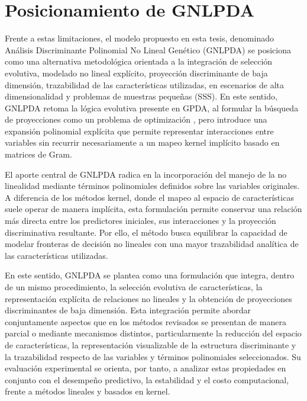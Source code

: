 \section{Posicionamiento de GNLPDA}

Frente a estas limitaciones, el modelo propuesto en esta tesis, denominado Análisis Discriminante Polinomial No Lineal Genético (GNLPDA) se posiciona como una alternativa metodológica orientada a la integración de selección evolutiva, modelado no lineal explícito, proyección discriminante de baja dimensión, trazabilidad de las características utilizadas, en escenarios de alta dimensionalidad y problemas de muestras pequeñas (SSS). En este sentido, GNLPDA retoma la lógica evolutiva presente en GPDA, al formular la búsqueda de proyecciones como un problema de optimización \cite{medina2025genetic}, pero introduce una expansión polinomial explícita que permite representar interacciones entre variables sin recurrir necesariamente a un mapeo kernel implícito basado en matrices de Gram.

El aporte central de GNLPDA radica en la incorporación del manejo de la no linealidad mediante términos polinomiales definidos sobre las variables originales. A diferencia de los métodos kernel, donde el mapeo al espacio de características suele operar de manera implícita, esta formulación permite conservar una relación más directa entre los predictores iniciales, sus interacciones y la proyección discriminativa resultante.  Por ello, el método busca equilibrar la capacidad de modelar fronteras de decisión no lineales con una mayor trazabilidad analítica de las características utilizadas.

En este sentido, GNLPDA se plantea como una formulación que integra, dentro de un mismo procedimiento, la selección evolutiva de características, la representación explícita de relaciones no lineales y la obtención de proyecciones discriminantes de baja dimensión. Esta integración permite abordar conjuntamente aspectos que en los métodos revisados se presentan de manera parcial o mediante mecanismos distintos, particularmente la reducción del espacio de características, la representación visualizable de la estructura discriminante y la trazabilidad respecto de las variables y términos polinomiales seleccionados. Su evaluación experimental se orienta, por tanto, a analizar estas propiedades en conjunto con el desempeño predictivo, la estabilidad y el costo computacional, frente a métodos lineales y basados en kernel.


